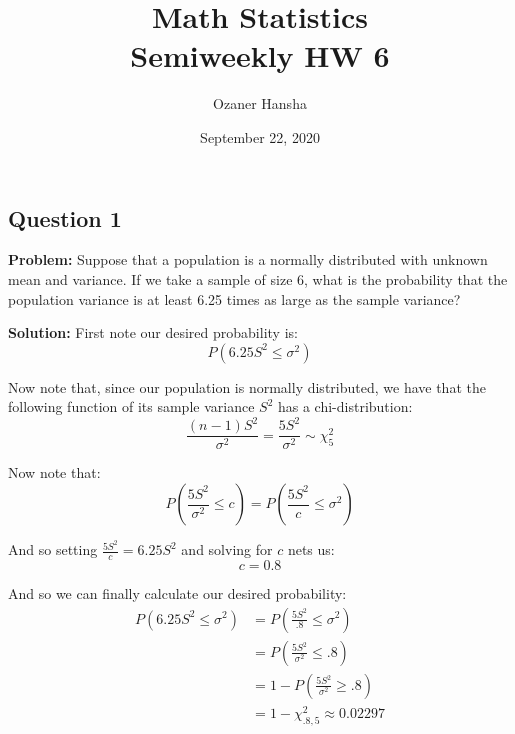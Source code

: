 \documentclass{article}
\begin{document}
\title{Math Statistics\\ Semiweekly HW 6}
\author{Ozaner Hansha}
\date{September 22, 2020}
\maketitle

\subsection*{Question 1}
\noindent\textbf{Problem:} Suppose that a population is a normally distributed with unknown mean and variance. If we take a sample of size 6, what is the probability that the population variance is at least 6.25 times as large as the sample variance?
\bigskip

\noindent\textbf{Solution:} First note our desired probability is:
$$P(6.25S^2\le\sigma^2)$$

Now note that, since our population is normally distributed, we have that the following function of its sample variance $S^2$ has a chi-distribution:
$$\frac{(n-1)S^2}{\sigma^2}=\frac{5S^2}{\sigma^2}\sim\chi_5^2$$

Now note that:
$$P\left(\frac{5S^2}{\sigma^2}\le c\right)=P\left(\frac{5S^2}{c}\le \sigma^2\right)$$

And so setting $\frac{5S^2}{c}=6.25S^2$ and solving for $c$ nets us:
$$c=0.8$$

And so we can finally calculate our desired probability:
\begin{align*}
    P(6.25S^2\le\sigma^2)&=P\left(\frac{5S^2}{.8}\le \sigma^2\right)\\
    &=P\left(\frac{5S^2}{\sigma^2}\le .8\right)\\
    &=1-P\left(\frac{5S^2}{\sigma^2}\ge .8\right)\tag{complement}\\
    &=1-\chi^2_{.8,5}\approx0.02297\tag{chi distribution}
\end{align*}
\end{document}
